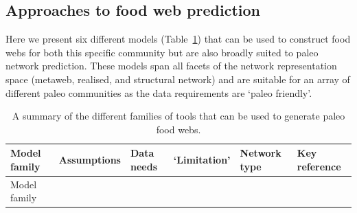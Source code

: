 \documentclass[
]{article}
\begin{document}
\subsection{Approaches to food web
prediction}\label{approaches-to-food-web-prediction}

Here we present six different models (Table~\ref{tbl-models}) that can
be used to construct food webs for both this specific community but are
also broadly suited to paleo network prediction. These models span all
facets of the network representation space (metaweb, realised, and
structural network) and are suitable for an array of different paleo
communities as the data requirements are `paleo friendly'.

\begin{longtable}[]{@{}
  >{\raggedright\arraybackslash}p{}
  >{\raggedright\arraybackslash}p{}
  >{\raggedright\arraybackslash}p{}
  >{\raggedright\arraybackslash}p{}
  >{\raggedright\arraybackslash}p{}
  >{\raggedright\arraybackslash}p{}@{}}
\caption{A summary of the different families of tools that can be used
to generate paleo food webs.}\label{tbl-models}\tabularnewline
\toprule\noalign{}
\begin{minipage}[b]{\linewidth}\raggedright
Model family
\end{minipage} & \begin{minipage}[b]{\linewidth}\raggedright
Assumptions
\end{minipage} & \begin{minipage}[b]{\linewidth}\raggedright
Data needs
\end{minipage} & \begin{minipage}[b]{\linewidth}\raggedright
`Limitation'
\end{minipage} & \begin{minipage}[b]{\linewidth}\raggedright
Network type
\end{minipage} & \begin{minipage}[b]{\linewidth}\raggedright
Key reference
\end{minipage} \\
\midrule\noalign{}
\endfirsthead
\toprule\noalign{}
\begin{minipage}[b]{\linewidth}\raggedright
Model family
\end{minipage} & \begin{minipage}[b]{\linewidth}\raggedright

\end{minipage}
\end{longtable}
\end{document}
